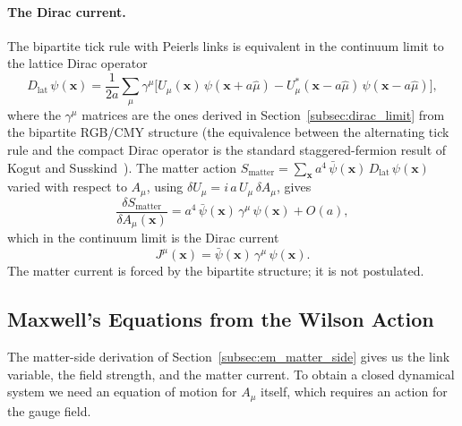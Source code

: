 \paragraph{The Dirac current.}
The bipartite tick rule with Peierls links is equivalent in the
continuum limit to the lattice Dirac operator
\begin{equation}
    D_\text{lat}\,\psi(\mathbf{x}) = \frac{1}{2a}\sum_\mu \gamma^\mu
    \bigl[
        U_\mu(\mathbf{x})\,\psi(\mathbf{x}+a\hat{\mu})
        - U_\mu^*(\mathbf{x}-a\hat{\mu})\,\psi(\mathbf{x}-a\hat{\mu})
    \bigr],
    \label{eq:lattice_dirac}
\end{equation}
where the $\gamma^\mu$ matrices are the ones derived in
Section~\ref{subsec:dirac_limit} from the bipartite RGB/CMY
structure (the equivalence between the alternating tick rule and the
compact Dirac operator is the standard staggered-fermion result of
Kogut and Susskind~\cite{kogutsusskind1975}).
The matter action $S_\text{matter} = \sum_\mathbf{x} a^4\,\bar\psi(\mathbf{x})\,D_\text{lat}\,\psi(\mathbf{x})$
varied with respect to $A_\mu$, using $\delta U_\mu = i\,a\,U_\mu\,\delta A_\mu$, gives
\begin{equation}
    \frac{\delta S_\text{matter}}{\delta A_\mu(\mathbf{x})}
        = a^4\,\bar\psi(\mathbf{x})\,\gamma^\mu\,\psi(\mathbf{x}) + O(a),
\end{equation}
which in the continuum limit is the Dirac current
\begin{equation}
    \boxed{\;J^\mu(\mathbf{x}) = \bar\psi(\mathbf{x})\,\gamma^\mu\,\psi(\mathbf{x}).\;}
    \label{eq:dirac_current}
\end{equation}
The matter current is forced by the bipartite structure; it is not
postulated.

\subsection{Maxwell's Equations from the Wilson Action}
\label{subsec:maxwell_from_wilson}

The matter-side derivation of Section~\ref{subsec:em_matter_side}
gives us the link variable, the field strength, and the matter
current. To obtain a closed dynamical system we need an equation of
motion for $A_\mu$ itself, which requires an action for the gauge
field.

